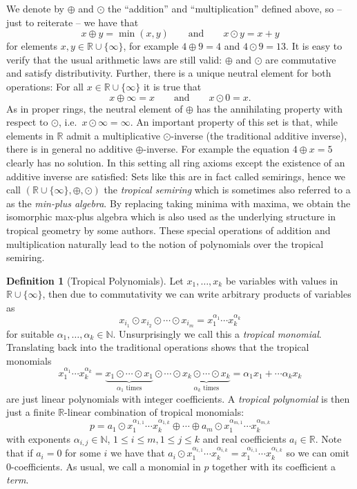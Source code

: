 \documentclass[
  paper=a4,
  DIV=14,
  fontsize=12pt,
  titlepage,
  bibliography=totoc,
  listof=totoc,
  pagesize=pdftex
]{scrartcl}
\numberwithin{figure}{section}
\numberwithin{equation}{section}
\numberwithin{table}{section}
\newcommand*\setR{\mathds{R}}
\newcommand*\setN{\mathds{N}}
\theoremstyle{definition}
\newtheorem{definition}{Definition}
\numberwithin{definition}{section}
\begin{document}
We denote by $\oplus$ and $\odot$ the \enquote{addition} and \enquote{multiplication}
defined above, so -- just to reiterate -- we have that
\[
  x \oplus y = \min(x,y)
  \qquad \text{and} \qquad
  x \odot y = x+y
\]
for elements $x,y\in \setR\cup\{\infty\}$, for example $4\oplus9 = 4$ and $4\odot9 = 13$.
It is easy to verify that the usual arithmetic laws are still valid: $\oplus$ and $\odot$
are commutative and satisfy distributivity. Further, there is a unique neutral  element
for both operations: For all $x\in \setR\cup \{\infty\}$ it is true that
\[
  x \oplus \infty = x
  \qquad \text{and} \qquad
  x \odot 0 = x.
\]
As in proper rings, the neutral element of $\oplus$ has the annihilating property with
respect to $\odot$, i.e.\ $x\odot \infty = \infty$. An important property of this set is
that, while elements in $\setR$ admit a multiplicative $\odot$-inverse (the traditional
additive inverse), there is in general no additive $\oplus$-inverse. For example the
equation $4\oplus x = 5$ clearly has no solution. In this setting all ring axioms except
the existence of an additive inverse are satisfied: Sets like this are in fact called
semirings, hence we call $(\setR\cup \{\infty\}, \oplus, \odot)$ the \emph{tropical
semiring} which is sometimes also referred to a as the \emph{min-plus algebra}. By
replacing taking minima with maxima, we obtain the isomorphic max-plus algebra which is
also used as the underlying structure in tropical geometry by some authors. These special
operations of addition and multiplication naturally lead to the notion of polynomials over
the tropical semiring.

\begin{definition}[Tropical Polynomials]
  Let $x_1, \dots, x_k$ be variables with values in $\setR\cup\{\infty\}$, then due to
  commutativity we can write arbitrary products of variables as
  \[
    x_{i_1} \odot x_{i_2} \odot \cdots \odot x_{i_m}
    = x_1^{\alpha_1} \cdots x_k^{\alpha_k}
  \]
  for suitable $\alpha_1, \dots, \alpha_k \in \setN$. Unsurprisingly we call this a
  \emph{tropical monomial}. Translating back into the traditional operations shows that
  the tropical monomials
  \[
    x_1^{\alpha_1} \cdots x_k^{\alpha_k} =
    \underbrace{x_1\odot\cdots\odot x_1}_{\alpha_1 \text{ times}}
    \odot\cdots\odot
    \underbrace{x_k\odot\cdots\odot x_k}_{\alpha_k \text{ times}}
    = \alpha_1x_1 + \cdots \alpha_kx_k
  \]
  are just linear polynomials with integer coefficients. A \emph{tropical polynomial} is
  then just a finite $\setR$-linear combination of tropical monomials:
  \[
    p = a_1 \odot x_1^{\alpha_{1,1}}\cdots x_k^{\alpha_{1,k}} \oplus \cdots \oplus
    a_m \odot x_1^{\alpha_{m,1}}\cdots x_k^{\alpha_{m,k}}
  \]
  with exponents $\alpha_{i,j} \in \setN$, $1\leq i \leq m, 1\leq j \leq k$ and real
  coefficients $a_i \in \setR$. Note that if $a_i = 0$ for some $i$ we have that $a_i\odot
  x_1^{\alpha_{i,1}}\cdots x_k^{\alpha_{i,k}} = x_1^{\alpha_{i,1}}\cdots
  x_k^{\alpha_{i,k}}$ so we can omit $0$-coefficients. As usual, we call a monomial in $p$
  together with its coefficient a \emph{term}.
  \label{def:tropPoly}
\end{definition}
\end{document}
